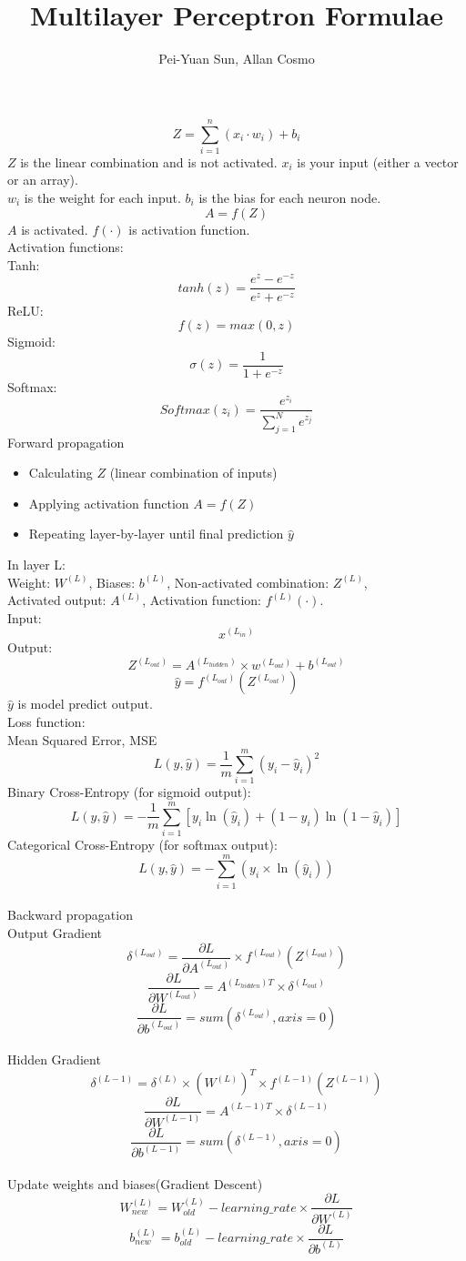\documentclass{article}
\title{Multilayer Perceptron Formulae}
\author{Pei-Yuan Sun, Allan Cosmo}
\begin{document}
\maketitle
    $$Z = \sum_{i=1}^{n}(x_{i} \cdot w_{i})+b_{i}$$
    ${Z}$ is the linear combination and is not activated.
    $x_{i}$ is your input (either a vector or an array).\\
    $w_{i}$ is the weight for each input.
    $b_{i}$ is the bias for each neuron node.
    $$A=f(Z)$$
    $A$ is activated.
    $f(\cdot)$ is activation function.\\
    Activation functions:\\[10pt]
    Tanh:$$tanh(z)=\frac{e^z-e^{-z}}{e^z+e^{-z}}$$
    ReLU:$$f(z)=max(0,z)$$
    Sigmoid:$$\sigma(z)=\frac{1}{1+e^{-z}}$$
    Softmax:$$Softmax(z_i)=\frac{e^{z_i}}{\sum_{j=1}^{N}e^{z_j}}$$
    Forward propagation\\
    \begin{itemize}
        \item Calculating $Z$ (linear combination of inputs)
        \item Applying activation function $A = f(Z)$
        \item Repeating layer-by-layer until final prediction $\hat{y}$
    \end{itemize}
    In layer L:\\ 
    Weight: $W^{(L)}$, Biases: $b^{(L)}$, Non-activated combination: $Z^{(L)}$,\\
    Activated output: $A^{(L)}$, Activation function: $f^{(L)}(\cdot)$.\\
    Input: $$x^{(L_{in})}$$
    Output:$$Z^{(L_{out})}=A^{(L_{hidden})}\times w^{(L_{out})}+b^{(L_{out})}$$
    $$\hat{y}=f^{(L_{out})}(Z^{(L_{out})})$$
    $\hat{y}$ is model predict output.\\
    Loss function:\\[10pt]
    Mean Squared Error, MSE
    $$L(y,\hat{y})=\frac{1}{m}\sum_{i=1}^{m}(y_i-\hat{y}_i)^2$$
    Binary Cross-Entropy (for sigmoid output): \\
    $$L(y,\hat{y})=-\frac{1}{m}\sum_{i=1}^{m}[y_i\ln(\hat{y}_i)+(1-y_i)\ln(1-\hat{y}_i)]$$
    Categorical Cross-Entropy (for softmax output): \\
    $$L(y,\hat{y})=-\sum_{i=1}^{m}(y_i\times\ln(\hat{y}_i))$$\\
    Backward propagation\\
    Output Gradient
    $$\delta^{(L_{out})}=\frac{\partial L}{\partial A^{(L_{out})}}\times f^{(L_{out})}(Z^{(L_{out})})$$
    $$\frac{\partial L}{\partial W^{(L_{out})}}=A^{(L_{hidden})T}\times\delta^{(L_{out})}$$
    $$\frac{\partial L}{\partial b^{(L_{out})}}=sum(\delta^{(L_{out})},axis=0)$$\\
    Hidden Gradient
    $$\delta^{(L-1)}=\delta^{(L)}\times (W^{(L)})^T\times f^{(L-1)}(Z^{(L-1)})$$
    $$\frac{\partial L}{\partial W^{(L-1)}}=A^{(L-1)T}\times\delta^{(L-1)}$$
    $$\frac{\partial L}{\partial b^{(L-1)}}=sum(\delta^{(L-1)},axis=0)$$\\
    Update weights and biases(Gradient Descent)
    $$W^{(L)}_{new}=W^{(L)}_{old}-learning\_rate\times\frac{\partial L}{\partial W^{(L)}}$$
    $$b^{(L)}_{new}=b^{(L)}_{old}-learning\_rate\times\frac{\partial L}{\partial b^{(L)}}$$
\end{document}
